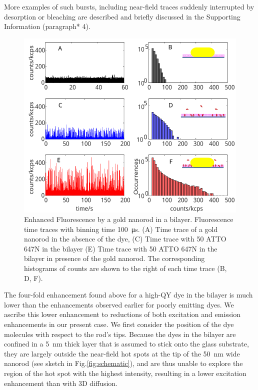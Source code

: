 More examples of such bursts, including near-field traces suddenly interrupted by desorption or bleaching are described and briefly discussed in the Supporting Information (paragraph* 4).
\begin{figure}
	\centering
	\includegraphics[]{timetrace_hist}
	\caption{Enhanced Fluorescence by a gold nanorod in a bilayer. Fluorescence time traces with binning time \SI{100}{\us}. 
	(A) Time trace of a gold nanorod in the absence of the dye, (C) Time trace with \SI{50}{\pM} ATTO 647N in the bilayer (E) Time trace with \SI{50}{\pM} ATTO 647N in the bilayer in presence of the gold nanorod. 
	The corresponding histograms of counts are shown to the right of each time trace (B, D, F).}
	\label{fig:timetrace_hist}
\end{figure}
The four-fold enhancement found above for a high-QY dye in the bilayer is much lower than the enhancements observed earlier for poorly emitting dyes.\cite{yuan2013thousandfold}
We ascribe this lower enhancement to reductions of both excitation and emission enhancements in our present case.
We first consider the position of the dye molecules with respect to the rod’s tips.
Because the dyes in the bilayer are confined in a \SI{5}{\nm} thick layer that is assumed to stick onto the glass substrate, they are largely outside the near-field hot spots at the tip of the \SI{50}{\nm} wide nanorod (see sketch in Fig.\ref{fig:schematic}), and are thus unable to explore the region of the hot spot with the highest intensity, resulting in a lower excitation enhancement than with 3D diffusion.
